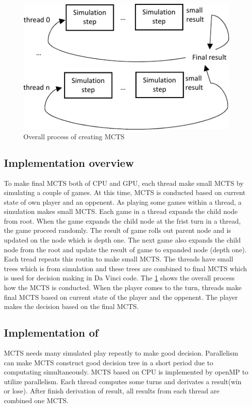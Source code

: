 \begin{figure}
\includegraphics[width=0.95\columnwidth]{figures/implementation.pdf}
\caption{Overall process of creating MCTS}
\label{fig:implementation}
\end{figure}

\subsection{Implementation overview}
To make final MCTS both of CPU and GPU, each thread make small MCTS by simulating a couple of games.
At this time, MCTS is conducted based on current state of own player and an oppenent.
As playing some games within a thread, a simulation makes small MCTS.
Each game in a thread expands the child node from root. 
When the game expands the child node at the frist turn in a thread, the game proceed randomly. 
The result of game rolls out parent node and is updated on the node which is depth one. 
The next game also expands the child node from the root and update the result of game to expanded node (depth one).
Each tread repeats this routin to make small MCTS. 
The threads have small trees which is from simulation and these trees are combined to final MCTS which is used for decision making in Da Vinci code. 
The \cref{fig:implementation} shows the overall process how the MCTS is conducted.
When the player comes to the turn, threads make final MCTS based on current state of the player and the oppenent. 
The player makes the decision based on the final MCTS. 

\subsection{Implementation of \cpu}
MCTS needs many simulated play repeatly to make good decision. 
Parallelism can make MCTS construct good decision tree in a short period due to computating simultaneously. 
MCTS based on CPU is implemented by openMP to utilize parallelism. Each thread computes some turns and derivates a result(win or lose). 
After finish derivation of result, all results from each thread are combined one MCTS.


